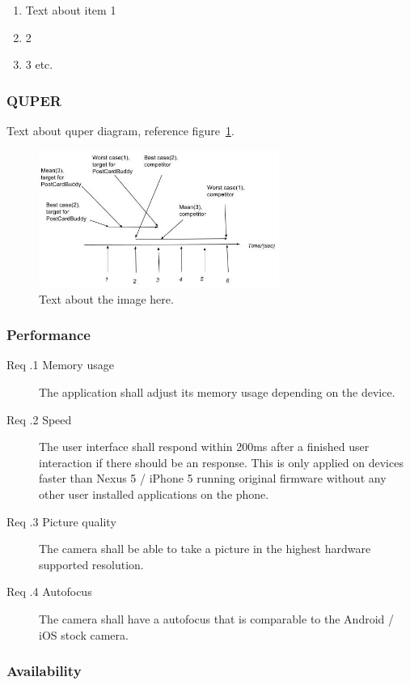 \documentclass[10pt,a4paper]{article}
\newcommand{\tsss}{\thesubsubsection}
\begin{document}
\begin{enumerate}
\item Text about item 1
\item 2
\item 3 etc.
\end{enumerate}

\subsubsection{QUPER}
Text about quper diagram, reference figure~\ref{fig:quper}.


\begin{figure}[h!]
\centering
\includegraphics[width=0.7\textwidth]{QUPER_v1.jpg}
\caption{Text about the image here.}
\label{fig:quper}
\end{figure}


\subsubsection{Performance}
\begin{description}
	\item[Req \tsss.1 Memory usage] The application shall adjust its memory usage depending on the device.
	\item[Req \tsss.2 Speed] The user interface shall respond within 200ms after a finished user interaction if there should be an response. This is only applied on devices faster than Nexus 5 / iPhone 5 running original firmware without any other user installed applications on the phone.
	\item[Req \tsss.3 Picture quality] The camera shall be able to take a picture in the highest hardware supported resolution. 
	\item[Req \tsss.4 Autofocus] The camera shall have a autofocus that is comparable to the Android / iOS stock camera. 
\end{description}
\subsubsection{Availability}
\end{document}

